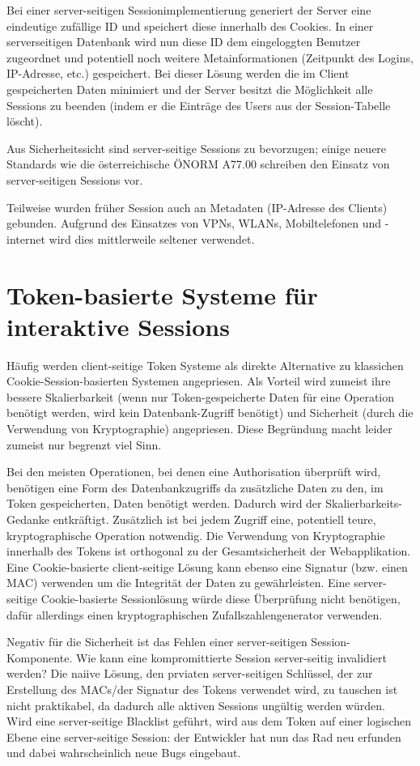 Bei einer server-seitigen Sessionimplementierung generiert der Server eine eindeutige zufällige ID und speichert diese innerhalb des Cookies. In einer serverseitigen Datenbank wird nun diese ID dem eingeloggten Benutzer zugeordnet und potentiell noch weitere Metainformationen (Zeitpunkt des Logins, IP-Adresse, etc.) gespeichert. Bei dieser Lösung werden die im Client gespeicherten Daten minimiert und der Server besitzt die Möglichkeit alle Sessions zu beenden (indem er die Einträge des Users aus der Session-Tabelle löscht).

Aus Sicherheitssicht sind server-seitige Sessions zu bevorzugen; einige neuere Standards wie die österreichische ÖNORM A77.00 schreiben den Einsatz von server-seitigen Sessions vor.

Teilweise wurden früher Session auch an Metadaten (IP-Adresse des Clients) gebunden. Aufgrund des Einsatzes von VPNs, WLANs, Mobiltelefonen und -internet wird dies mittlerweile seltener verwendet.

\section{Token-basierte Systeme für interaktive Sessions}

Häufig werden client-seitige Token Systeme als direkte Alternative zu klassichen Cookie-Session-basierten Systemen angepriesen. Als Vorteil wird zumeist ihre bessere Skalierbarkeit (wenn nur Token-gespeicherte Daten für eine Operation benötigt werden, wird kein Datenbank-Zugriff benötigt) und Sicherheit (durch die Verwendung von Kryptographie) angepriesen. Diese Begründung macht leider zumeist nur begrenzt viel Sinn.

Bei den meisten Operationen, bei denen eine Authorisation überprüft wird, benötigen eine Form des Datenbankzugriffs da zusätzliche Daten zu den, im Token gespeicherten, Daten benötigt werden. Dadurch wird der Skalierbarkeits-Gedanke entkräftigt. Zusätzlich ist bei jedem Zugriff eine, potentiell teure, kryptographische Operation notwendig. Die Verwendung von Kryptographie innerhalb des Tokens ist orthogonal zu der Gesamtsicherheit der Webapplikation. Eine Cookie-basierte client-seitige Lösung kann ebenso eine Signatur (bzw. einen MAC) verwenden um die Integrität der Daten zu gewährleisten. Eine server-seitige Cookie-basierte Sessionlösung würde diese Überprüfung nicht benötigen, dafür allerdings einen kryptographischen Zufallszahlengenerator verwenden.

Negativ für die Sicherheit ist das Fehlen einer server-seitigen Session-Komponente. Wie kann eine kompromittierte Session server-seitig invalidiert werden? Die naiive Lösung, den prviaten server-seitigen Schlüssel, der zur Erstellung des MACs/der Signatur des Tokens verwendet wird, zu tauschen ist nicht praktikabel, da dadurch alle aktiven Sessions ungültig werden würden. Wird eine server-seitige Blacklist geführt, wird aus dem Token auf einer logischen Ebene eine server-seitige Session: der Entwickler hat nun das Rad neu erfunden und dabei wahrscheinlich neue Bugs eingebaut.

